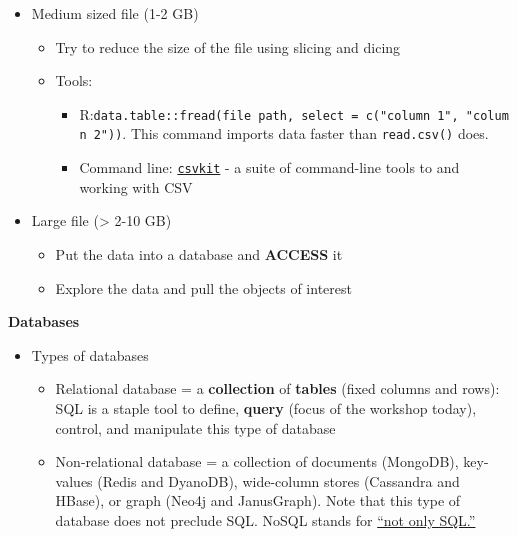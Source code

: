 \documentclass[
]{book}
\providecommand{\tightlist}{%
  \setlength{\itemsep}{0pt}\setlength{\parskip}{0pt}}
\begin{document}
\begin{itemize}
\tightlist
\item
  Medium sized file (1-2 GB)

  \begin{itemize}
  \tightlist
  \item
    Try to reduce the size of the file using slicing and dicing
  \item
    Tools:

    \begin{itemize}
    \tightlist
    \item
      R:\texttt{data.table::fread(file\ path,\ select\ =\ c("column\ 1",\ "column\ 2"))}. This command imports data faster than \texttt{read.csv()} does.
    \item
      Command line: \href{https://csvkit.readthedocs.io/en/latest/}{\texttt{csvkit}} - a suite of command-line tools to and working with CSV
    \end{itemize}
  \end{itemize}
\item
  Large file (\textgreater{} 2-10 GB)

  \begin{itemize}
  \tightlist
  \item
    Put the data into a database and \textbf{ACCESS} it
  \item
    Explore the data and pull the objects of interest
  \end{itemize}
\end{itemize}

\textbf{Databases}

\begin{itemize}
\tightlist
\item
  Types of databases

  \begin{itemize}
  \tightlist
  \item
    Relational database = a \textbf{collection} of \textbf{tables} (fixed columns and rows): SQL is a staple tool to define, \textbf{query} (focus of the workshop today), control, and manipulate this type of database
  \item
    Non-relational database = a collection of documents (MongoDB), key-values (Redis and DyanoDB), wide-column stores (Cassandra and HBase), or graph (Neo4j and JanusGraph). Note that this type of database does not preclude SQL. NoSQL stands for \href{https://www.mongodb.com/nosql-explained}{``not only SQL.''}
  \end{itemize}
\end{itemize}
\end{document}
